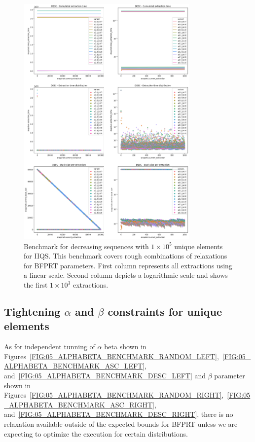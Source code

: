 \begin{figure}[!ht]
    \centering
    \includegraphics[width=0.79\textwidth]{./fragments/04_experimental_execution/images/04_alphabeta_detail_decreasing.png}
    \caption{Benchmark for decreasing sequences with $1\times10^5$ unique elements for IIQS. This benchmark covers rough combinations of relaxations for BFPRT parameters. First column represents all extractions using a linear scale. Second column depicts a logarithmic scale and shows the first $1\times10^3$ extractions. }
    \label{FIG:05_ALPHABETA_BENCHMARK_DESC}
\end{figure}


\subsection{Tightening $\alpha$ and $\beta$ constraints for unique elements}

As for independent tunning of $\alpha$ beta shown in Figures~\ref{FIG:05_ALPHABETA_BENCHMARK_RANDOM_LEFT},~\ref{FIG:05_ALPHABETA_BENCHMARK_ASC_LEFT}, and~\ref{FIG:05_ALPHABETA_BENCHMARK_DESC_LEFT} and $\beta$ parameter shown in Figures~\ref{FIG:05_ALPHABETA_BENCHMARK_RANDOM_RIGHT},~\ref{FIG:05_ALPHABETA_BENCHMARK_ASC_RIGHT}, and~\ref{FIG:05_ALPHABETA_BENCHMARK_DESC_RIGHT}, there is no relaxation available outside of the expected bounds for BFPRT unless we are expecting to optimize the execution for certain distributions.

